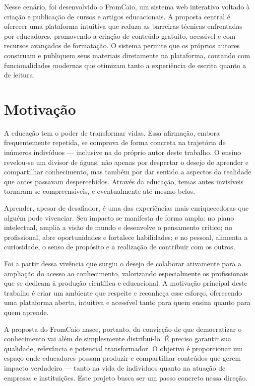Nesse cenário, foi desenvolvido o FromCaio, um sistema web interativo voltado à criação e publicação de cursos e artigos educacionais. A proposta central é oferecer uma plataforma intuitiva que reduza as barreiras técnicas enfrentadas por educadores, promovendo a criação de conteúdo gratuito, acessível e com recursos avançados de formatação. O sistema permite que os próprios autores construam e publiquem seus materiais diretamente na plataforma, contando com funcionalidades modernas que otimizam tanto a experiência de escrita quanto a de leitura.



\section{Motivação}
A educação tem o poder de transformar vidas. Essa afirmação, embora frequentemente repetida, se comprova de forma concreta na trajetória de inúmeros indivíduos — inclusive na do próprio autor deste trabalho. O ensino revelou-se um divisor de águas, não apenas por despertar o desejo de aprender e compartilhar conhecimento, mas também por dar sentido a aspectos da realidade que antes passavam despercebidos. Através da educação, temas antes invisíveis tornaram-se compreensíveis, e eventualmente até mesmo belos.

Aprender, apesar de desafiador, é uma das experiências mais enriquecedoras que alguém pode vivenciar. Seu impacto se manifesta de forma ampla: no plano intelectual, amplia a visão de mundo e desenvolve o pensamento crítico; no profissional, abre oportunidades e fortalece habilidades; e no pessoal, alimenta a curiosidade, o senso de propósito e a realização de contribuir com os outros.

Foi a partir dessa vivência que surgiu o desejo de colaborar ativamente para a ampliação do acesso ao conhecimento, valorizando especialmente os profissionais que se dedicam à produção científica e educacional. A motivação principal deste trabalho é criar um ambiente que respeite e reconheça esse esforço, oferecendo uma plataforma aberta, intuitiva e acessível tanto para quem ensina quanto para quem aprende.

A proposta do FromCaio nasce, portanto, da convicção de que democratizar o conhecimento vai além de simplesmente distribuí-lo. É preciso garantir sua qualidade, relevância e potencial transformador. O objetivo é proporcionar um espaço onde educadores possam produzir e compartilhar conteúdos que gerem impacto verdadeiro — tanto na vida de indivíduos quanto na atuação de empresas e instituições. Este projeto busca ser um passo concreto nessa direção.

